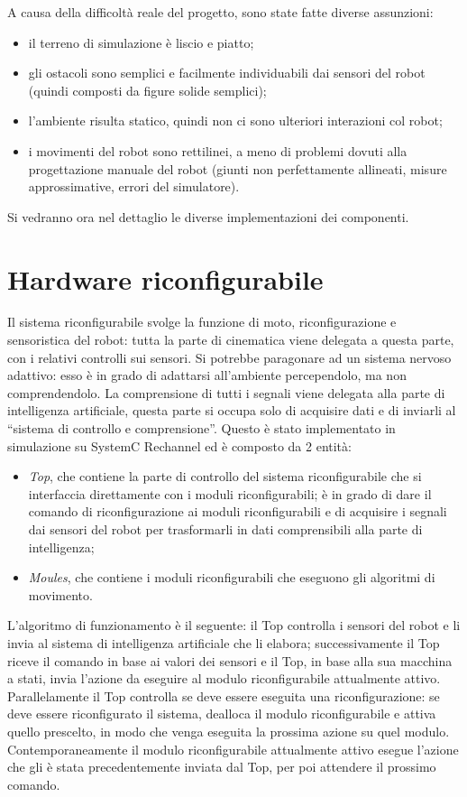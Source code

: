 \documentclass[a4paper,titlepage]{book}
\begin{document}
A causa della difficoltà reale del progetto, sono state fatte diverse assunzioni:
\begin{itemize}
  \item il terreno di simulazione è liscio e piatto;
  \item gli ostacoli sono semplici e facilmente individuabili dai sensori del robot (quindi composti da figure solide semplici);
  \item l'ambiente risulta statico, quindi non ci sono ulteriori interazioni col robot;
  \item i movimenti del robot sono rettilinei, a meno di problemi dovuti alla progettazione manuale del robot (giunti non perfettamente allineati, misure approssimative, errori del simulatore).
\end{itemize}

Si vedranno ora nel dettaglio le diverse implementazioni dei componenti.

\section{Hardware riconfigurabile}

Il sistema riconfigurabile svolge la funzione di moto, riconfigurazione e sensoristica del robot: tutta la parte di cinematica viene delegata a questa parte, con i relativi controlli sui sensori. Si potrebbe paragonare ad un sistema nervoso adattivo: esso è in grado di adattarsi all'ambiente percependolo, ma non comprendendolo. La comprensione di tutti i segnali viene delegata alla parte di intelligenza artificiale, questa parte si occupa solo di acquisire dati e di inviarli al ``sistema di controllo e comprensione''.
Questo è stato implementato in simulazione su SystemC Rechannel ed è composto da 2 entità:

\begin{itemize}
  \item \textit{Top}, che contiene la parte di controllo del sistema riconfigurabile che si interfaccia direttamente con i moduli riconfigurabili; è in grado di dare il comando di riconfigurazione ai moduli riconfigurabili e di acquisire i segnali dai sensori del robot per trasformarli in dati comprensibili alla parte di intelligenza;
  \item \textit{Moules}, che contiene i moduli riconfigurabili che eseguono gli algoritmi di movimento.
\end{itemize}

L'algoritmo di funzionamento è il seguente: il Top controlla i sensori del robot e li invia al sistema di intelligenza artificiale che li elabora; successivamente il Top riceve il comando in base ai valori dei sensori e il Top, in base alla sua macchina a stati, invia l'azione da eseguire al modulo riconfigurabile attualmente attivo.
Parallelamente il Top controlla se deve essere eseguita una riconfigurazione: se deve essere riconfigurato il sistema, dealloca il modulo riconfigurabile e attiva quello prescelto, in modo che venga eseguita la prossima azione su quel modulo.
Contemporaneamente il modulo riconfigurabile attualmente attivo esegue l'azione che gli è stata precedentemente inviata dal Top, per poi attendere il prossimo comando.
\end{document}
